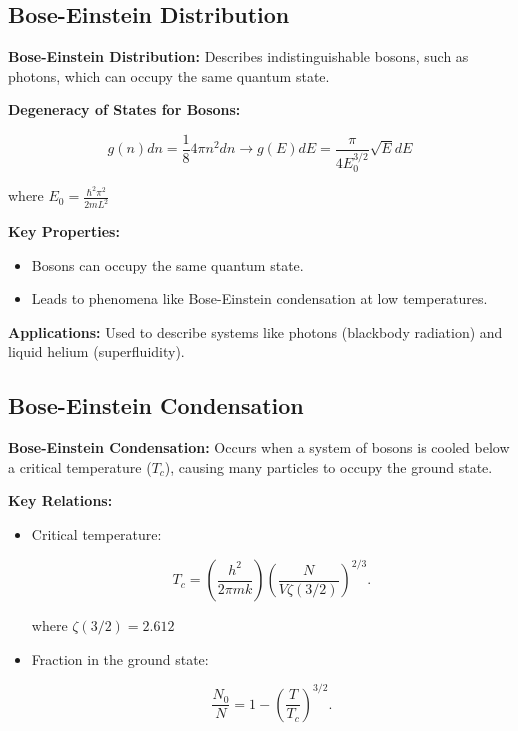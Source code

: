 \documentclass{article}
\newcommand{\eqbox}[1]{\begin{tcolorbox}[colback=gray!10] #1 \end{tcolorbox}}
\newcommand{\conceptbox}[1]{\begin{tcolorbox}[colback=blue!10] #1 \end{tcolorbox}}
\begin{document}
\subsection{Bose-Einstein Distribution}
\conceptbox{
\textbf{Bose-Einstein Distribution:}
Describes indistinguishable bosons, such as photons, which can occupy the same quantum state.

\textbf{Degeneracy of States for Bosons:}
\eqbox{
\[
g(n)dn = \frac{1}{8}4\pi n^2 dn \to g(E)dE = \frac{\pi}{4 E_0^{3/2}}\sqrt E dE
\]
}
where \( E_0 = \displaystyle\frac{\hbar^2 \pi^2}{2m L^2} \)

\textbf{Key Properties:}
\begin{itemize}
    \item Bosons can occupy the same quantum state.
    \item Leads to phenomena like Bose-Einstein condensation at low temperatures.
\end{itemize}

\textbf{Applications:}
Used to describe systems like photons (blackbody radiation) and liquid helium (superfluidity).
}

\subsection{Bose-Einstein Condensation}
\conceptbox{
\textbf{Bose-Einstein Condensation:}
Occurs when a system of bosons is cooled below a critical temperature (\( T_c \)), causing many particles to occupy the ground state.

\textbf{Key Relations:}
\begin{itemize}
    \item Critical temperature:
    \eqbox{
    \[
    T_c = \left(\frac{h^2}{2\pi mk}\right) \left(\frac{N}{V\zeta(3/2)}\right)^{2/3}.
    \]
    }
    where \(\zeta(3/2) = 2.612\)
    \item Fraction in the ground state:
    \eqbox{
    \[
    \frac{N_0}{N} = 1 - \left(\frac{T}{T_c}\right)^{3/2}.
    \]
    }
\end{itemize}
}
\end{document}
